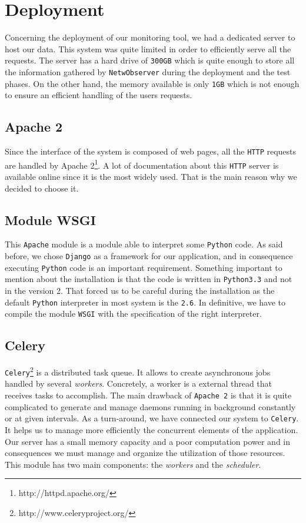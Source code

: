 \section{Deployment}
Concerning the deployment of our monitoring tool, we had a dedicated server to host our data. This system was quite limited in order to efficiently serve all the requests. The server has a hard drive of \texttt{300GB} which is quite enough to store all the information gathered by \texttt{NetwObserver} during the deployment and the test phases. On the other hand, the memory available is only \texttt{1GB} which is not enough to ensure an efficient handling of the users requests.

\subsection{Apache 2}
Since the interface of the system is composed of web pages, all the \texttt{HTTP} requests are handled by Apache 2\footnote{http://httpd.apache.org/}. A lot of documentation about this \texttt{HTTP} server is available online since it is the most widely used. That is the main reason why we decided to choose it.

\subsection{Module WSGI}
This \texttt{Apache} module is a module able to interpret some \texttt{Python} code. As said before, we chose \texttt{Django} as a framework for our application, and in consequence executing \texttt{Python} code is an important requirement. Something important to mention about the installation is that the code is written in \texttt{Python3.3} and not in the version 2. That forced us to be careful during the installation as the default \texttt{Python} interpreter in most system is the \texttt{2.6}. In definitive, we have to compile the module \texttt{WSGI} with the specification of the right interpreter.

\subsection{Celery}
\texttt{Celery}\footnote{http://www.celeryproject.org/} is a distributed task queue. It allows to create asynchronous jobs handled by several \emph{workers}. Concretely, a worker is a external thread that receives tasks to accomplish. The main drawback of \texttt{Apache 2} is that it is quite complicated to generate and manage daemons running in background constantly or at given intervals. As a turn-around, we have connected our system to \texttt{Celery}. It helps us to manage more efficiently the concurrent elements of the application. Our server has a small memory capacity and a poor computation power and in consequences we must manage and organize the utilization of those resources. This module has two main components: the \emph{workers} and the \emph{scheduler}.

